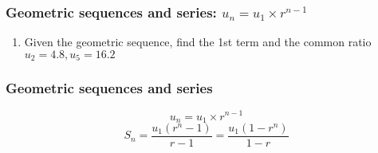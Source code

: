 \documentclass{beamer}
\begin{document}
\frame
{
  \frametitle{Geometric sequences and series: $u_n=u_1 \times r^{n-1}$}

  \begin{enumerate}
    \item Given the geometric sequence, find the 1st term and the common ratio \\
         $u_2=4.8, u_5=16.2$ \vspace{2cm}
    \end{enumerate}\vspace{5cm}
    }

\frame
{
  \frametitle{Geometric sequences and series}
  \[u_n=u_1 \times r^{n-1}\]
  \[S_n=\frac{u_1  (r^{n}-1)}{r-1} =\frac{u_1  (1-r^{n})}{1-r} \]
    }
\end{document}
